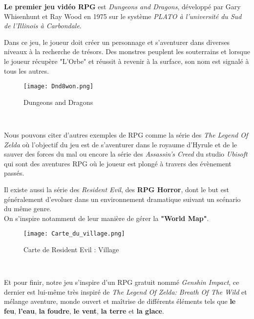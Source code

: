 \documentclass[12pt]{article}
\begin{document}
                \textbf{Le premier jeu vidéo RPG} est \textit{Dungeons and Dragons}, développé par Gary Whisenhunt et Ray Wood en 1975 sur le système \textit{PLATO à l’université du Sud de l'Illinois à Carbondale}.
                \par Dans ce jeu, le joueur doit créer un personnage et s'aventurer dans diverses niveaux à la recherche de trésors. Des monstres peuplent les souterrains et lorsque le joueur récupère "L'Orbe" et réussit à revenir à la surface, son nom est signalé à tous les autres.
                \\
                 \begin{figure}[h]
                    \centering
                    \texttt{[image: Dnd8won.png]}
                    \caption{Dungeons and Dragons}
                \end{figure}
                \\
                \par Nous pouvons citer d'autres exemples de RPG comme la série des \textit{The Legend Of Zelda}
                où l'objectif du jeu est de s'aventurer dans le royaume d'Hyrule et de le sauver des forces du mal ou encore la série des \textit{Assassin's Creed} du studio \textit{Ubisoft} qui sont des aventures RPG où le joueur est plongé à travers des évènement passés.
                
                \clearpage

                \par Il existe aussi la série des \textit{Resident Evil}, des \textbf{RPG Horror}, dont le but est généralement d'evoluer dans un environnement dramatique suivant un scénario du même genre. 
                \\On s'inspire notamment de leur manière de gérer la \textbf{"World Map"}.
                \\
                \begin{figure}[h]
                    \centering
                    \texttt{[image: Carte\_du\_village.png]}
                    \caption{Carte de Resident Evil : Village}
                \end{figure}
                \\
                \par Et pour finir, notre jeu s'inspire d'un RPG gratuit nommé \textit{Genshin Impact}, ce dernier est lui-même très inspiré de \textit{The Legend Of Zelda: Breath Of The Wild} et mélange aventure, monde ouvert et maîtrise de différents éléments tels que \textbf{le feu}, \textbf{l'eau}, \textbf{la foudre}, \textbf{le vent}, \textbf{la terre} et \textbf{la glace}. 
\end{document}
